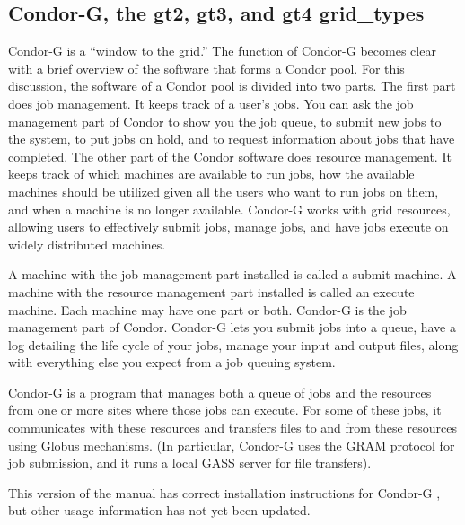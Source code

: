 
\subsection{\label{sec:Condor-G}Condor-G, the gt2, gt3, and gt4 grid\_types}

Condor-G is a ``window to the grid.''
The function of Condor-G becomes clear
with a brief overview of the software that forms a Condor pool.
For this discussion, the software of a Condor pool is divided
into two parts.
The first part does job management.
It keeps track of a user's jobs.
You can ask the job management part of Condor to show
you the job queue, to submit new jobs to the system,
to put jobs on hold,
and to request information about jobs that have completed.
The other part of the Condor software
does resource management.
It keeps track of which machines are available to run jobs,
how the available machines should be utilized given all the users
who want to run jobs on them,
and when a machine is no longer available.
Condor-G works with grid resources, allowing users to
effectively submit jobs, manage jobs, and have jobs execute
on widely distributed machines.

A machine with the job management part installed
is called a submit machine.
A machine with the resource management part installed 
is called an execute machine.
Each machine may have one part or both.
Condor-G is the job management part of Condor.
Condor-G lets you submit jobs into a queue,
have a log detailing the life cycle of your jobs,
manage your input and output files,
along with everything else you expect from a job queuing system.

Condor-G is a program that manages both a queue of jobs
and the resources from one or more sites where those jobs can execute. 
For some of these jobs,
it communicates with these resources and transfers files
to and from these resources using Globus mechanisms.
(In particular, Condor-G uses the GRAM protocol for job submission,
and it runs a local GASS server for file transfers).

\Note This version of the manual has correct installation instructions
for Condor-G \VersionNotice, but other usage information has not
yet been updated.











